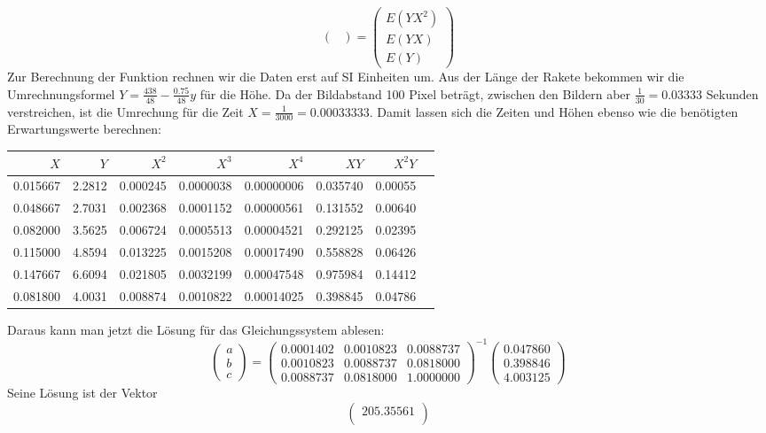 \begin{loesung}
\begin{teilaufgaben}
\[\begin{pmatrix}
\end{pmatrix}
=
\begin{pmatrix}
E(YX^2)\\E(YX)\\E(Y)
\end{pmatrix}
\]
Zur Berechnung der Funktion rechnen wir die Daten erst auf SI Einheiten
um. Aus der Länge der Rakete bekommen wir die Umrechnungsformel
$Y=\frac{438}{48} - \frac{0.75}{48}y$ für die Höhe.
Da der Bildabstand 100 Pixel
beträgt, zwischen den Bildern aber $\frac{1}{30}=0.03333$ Sekunden verstreichen,
ist die Umrechung für die Zeit $X=\frac{1}{3000}=0.00033333$. Damit
lassen sich die Zeiten und Höhen ebenso wie die benötigten Erwartungswerte
berechnen:
\begin{center}
\begin{tabular}{rrrrrrrr}
\hline
$X$&$Y$&$X^2$&$X^3$&$X^4$&$XY$&$X^2Y$\\
\hline
0.015667&2.2812&0.000245&0.0000038&0.00000006&0.035740&0.00055\\
0.048667&2.7031&0.002368&0.0001152&0.00000561&0.131552&0.00640\\
0.082000&3.5625&0.006724&0.0005513&0.00004521&0.292125&0.02395\\
0.115000&4.8594&0.013225&0.0015208&0.00017490&0.558828&0.06426\\
0.147667&6.6094&0.021805&0.0032199&0.00047548&0.975984&0.14412\\
\hline
0.081800&4.0031&0.008874&0.0010822&0.00014025&0.398845&0.04786\\
\hline
\end{tabular}
\end{center}
Daraus kann man jetzt die Lösung für das Gleichungssystem ablesen:
\[
\begin{pmatrix}
a\\b\\c
\end{pmatrix}
=\begin{pmatrix}
0.0001402&0.0010823&0.0088737\\
0.0010823&0.0088737&0.0818000\\
0.0088737&0.0818000&1.0000000
\end{pmatrix}^{-1}
\begin{pmatrix}
0.047860\\
0.398846\\
4.003125
\end{pmatrix}
\]
Seine Lösung ist der Vektor
\[
\begin{pmatrix}
   205.35561\\

\end{pmatrix}\]
\end{teilaufgaben}
\end{loesung}
